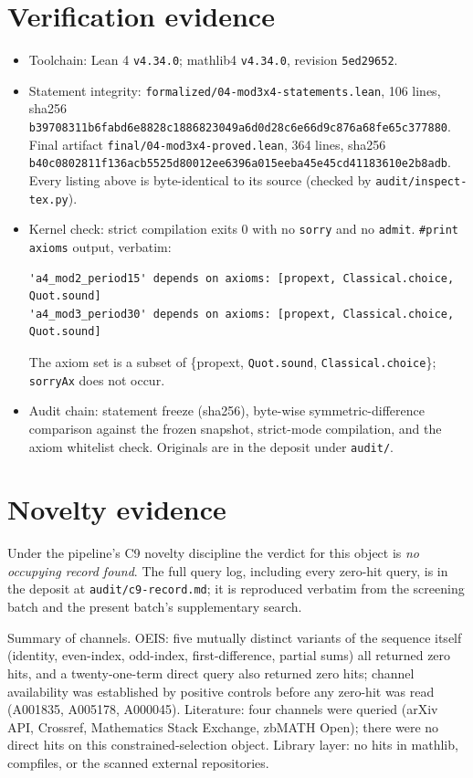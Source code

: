 \documentclass[11pt]{article}
\begin{document}
\section{Verification evidence}
\label{sec:verif}
\begin{itemize}
\item Toolchain: Lean 4 \texttt{v4.34.0}; mathlib4 \texttt{v4.34.0}, revision \texttt{5ed29652}.
\item Statement integrity: \texttt{formalized/04-mod3x4-statements.lean}, 106 lines,
sha256 \texttt{b39708311b6fabd6}\allowbreak\texttt{e8828c1886823049}\allowbreak\texttt{a6d0d28c6e66d9c8}\allowbreak\texttt{76a68fe65c377880}.
Final artifact \texttt{final/04-mod3x4-proved.lean}, 364 lines,
sha256 \texttt{b40c0802811f136a}\allowbreak\texttt{cb5525d80012ee63}\allowbreak\texttt{96a015eeba45e45c}\allowbreak\texttt{d41183610e2b8adb}.
Every listing above is byte-identical to its source (checked by \texttt{audit/inspect-tex.py}).
\item Kernel check: strict compilation exits 0 with no \texttt{sorry} and no \texttt{admit}.
\texttt{\#print axioms} output, verbatim:
\begin{verbatim}
'a4_mod2_period15' depends on axioms: [propext, Classical.choice, Quot.sound]
'a4_mod3_period30' depends on axioms: [propext, Classical.choice, Quot.sound]
\end{verbatim}
The axiom set is a subset of \{propext, \texttt{Quot.sound}, \texttt{Classical.choice}\};
\texttt{sorryAx} does not occur.
\item Audit chain: statement freeze (sha256), byte-wise symmetric-difference comparison against
the frozen snapshot, strict-mode compilation, and the axiom whitelist check. Originals are in
the deposit under \texttt{audit/}.
\end{itemize}

\section{Novelty evidence}
Under the pipeline's C9 novelty discipline the verdict for this object is \emph{no occupying
record found}. The full query log, including every zero-hit query, is in the deposit at
\texttt{audit/c9-record.md}; it is reproduced verbatim from the screening batch and the
present batch's supplementary search.

Summary of channels. OEIS: five mutually distinct variants of the sequence itself (identity,
even-index, odd-index, first-difference, partial sums) all returned zero hits, and a
twenty-one-term direct query also returned zero hits; channel availability was established by
positive controls before any zero-hit was read (A001835, A005178, A000045). Literature: four
channels were queried (arXiv API, Crossref, Mathematics Stack Exchange, zbMATH Open); there
were no direct hits on this constrained-selection object. Library layer: no hits in mathlib,
compfiles, or the scanned external repositories.
\end{document}
